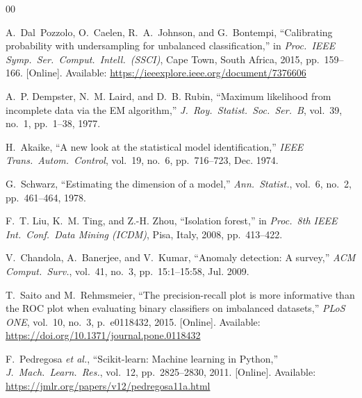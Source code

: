 \documentclass[conference]{IEEEtran}
\begin{document}
\begin{thebibliography}{00}

A.~Dal~Pozzolo, O.~Caelen, R.~A.~Johnson, and G.~Bontempi, ``Calibrating probability with undersampling for unbalanced classification,'' in \emph{Proc.\ IEEE Symp.\ Ser.\ Comput.\ Intell.\ (SSCI)}, Cape Town, South Africa, 2015, pp.~159--166. [Online]. Available: \url{https://ieeexplore.ieee.org/document/7376606}

A.~P. Dempster, N.~M. Laird, and D.~B. Rubin, ``Maximum likelihood from incomplete data via the EM algorithm,'' \emph{J.\ Roy.\ Statist.\ Soc.\ Ser.\ B}, vol.~39, no.~1, pp.~1--38, 1977.

H.~Akaike, ``A new look at the statistical model identification,'' \emph{IEEE Trans.\ Autom.\ Control}, vol.~19, no.~6, pp.~716--723, Dec. 1974.

G.~Schwarz, ``Estimating the dimension of a model,'' \emph{Ann.\ Statist.}, vol.~6, no.~2, pp.~461--464, 1978.

F.~T. Liu, K.~M. Ting, and Z.-H. Zhou, ``Isolation forest,'' in \emph{Proc.\ 8th IEEE Int.\ Conf.\ Data Mining (ICDM)}, Pisa, Italy, 2008, pp.~413--422.

V.~Chandola, A.~Banerjee, and V.~Kumar, ``Anomaly detection: A survey,'' \emph{ACM Comput.\ Surv.}, vol.~41, no.~3, pp.~15:1--15:58, Jul. 2009.

T.~Saito and M.~Rehmsmeier, ``The precision-recall plot is more informative than the ROC plot when evaluating binary classifiers on imbalanced datasets,'' \emph{PLoS ONE}, vol.~10, no.~3, p.~e0118432, 2015. [Online]. Available: \url{https://doi.org/10.1371/journal.pone.0118432}

F.~Pedregosa \emph{et al.}, ``Scikit-learn: Machine learning in Python,'' \emph{J.\ Mach.\ Learn.\ Res.}, vol.~12, pp.~2825--2830, 2011. [Online]. Available: \url{https://jmlr.org/papers/v12/pedregosa11a.html}

\end{thebibliography}
\end{document}
